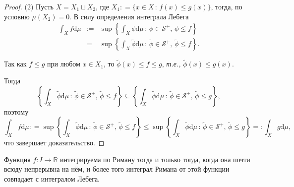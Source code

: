\begin{proof}
(2) Пусть $X = X_1 \sqcup X_2$, где $X_1: = \{x\in X\, :\, f(x) \le g(x)\}$, тогда, по условию $\mu(X_2) = 0.$ В силу определения интеграла Лебега 
\begin{eqnarray*}
    \int_X f \mathrm{d}\mu &:=& \sup \left\{ \int_X \phi \mathrm{d}\mu \, :\, \phi \in \mathcal{S}^+,\, \phi \le f \right\} \\
    &=& \sup \left\{ \int_X \widetilde{\phi} \mathrm{d}\mu \, :\, \widetilde{\phi} \in \mathcal{S}^+,\, \widetilde{\phi} \le f \right\}.
\end{eqnarray*}

Так как $f\le g$ при любом $x \in X_1$, то $\widetilde{\phi}(x) \le f \le g$, \textit{т.е.,} $\widetilde{\phi}(x) \le g(x)$.

Тогда
\[
\left\{ \int_X \widetilde{\phi} \mathrm{d}\mu \, :\, \widetilde{\phi} \in \mathcal{S}^+,\, \widetilde{\phi} \le f \right\} \subseteq \left\{ \int_X \widetilde{\phi} \mathrm{d}\mu \, :\, \widetilde{\phi} \in \mathcal{S}^+,\, \widetilde{\phi} \le g \right\},
\]
поэтому 
\[
 \int_Xf \mathrm{d}\mu : = \sup \left\{ \int_X \widetilde{\phi} \mathrm{d}\mu \, :\, \widetilde{\phi} \in \mathcal{S}^+,\, \widetilde{\phi} \le f \right\} \le \sup \left\{ \int_X \widetilde{\phi} \mathrm{d}\mu \, :\, \widetilde{\phi} \in \mathcal{S}^+,\, \widetilde{\phi} \le g \right\}=: \int_X g \mathrm{d}\mu,
\]
что завершает доказательство.    
\end{proof}


\begin{theorem}
    Функция $f:I \to \mathbb{R}$ интегрируема по Риману тогда и только тогда, когда она почти всюду непрерывна на нём, и более того интеграл Римана от этой функции совпадает с интегралом Лебега.
\end{theorem}